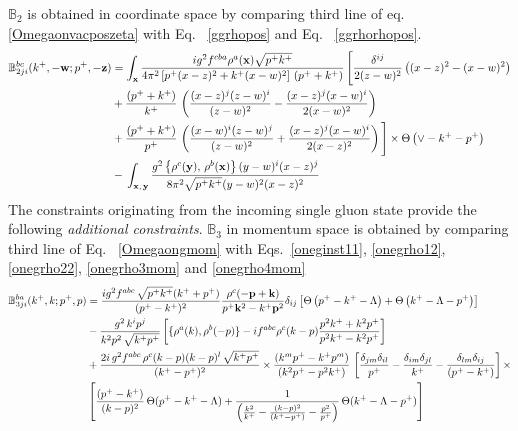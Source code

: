 \documentclass[aps,prd,amsmath,amssymb,nofootinbib]{revtex4-2}
\def\mf#1{\mathbb{#1}}
\def\v#1{\mathbf{#1}}
\numberwithin{equation}{section}
\begin{document}
$\mf{B}_{2}$ is obtained in coordinate space by comparing third line of eq. \eqref{Omegaonvacposzeta} with Eq.~ \eqref{ggrhopos} and Eq.~ \eqref{ggrhorhopos}.
\begin{align}
     \mf{B}^{bc}_{2ji}(k^{+}, -\v{w}; p^{+}, -\v{z}) & =    \int_{\mathbf{x}}\frac{ig^{2}f^{cba}\rho^{a}(\mathbf{x})\sqrt{p^{+}k^{+}}}{4\pi^{2}\left[p^{+}(x-z)^{2}+k^{+} (x-w)^{2}\right]\,(p^{+}+k^{+})}\,\Bigg[\frac{\delta^{ij}}{2(z-w)^{2}}\left((x-z)^{2}-(x-w)^{2}\right)\notag \\ & +\frac{(p^{+}+k^{+})}{k^{+}}\,\left(\frac{(x-z)^{j}(z-w)^{i}}{(z-w)^{2}}-\frac{(x-z)^{j}(x-w)^{i}}{2(x-w)^{2}}\right)\notag \\ & +\frac{(p^{+}+k^{+})}{p^{+}}\,\left(\frac{(x-w)^{i}(z-w)^{j}}{(z-w)^{2}} +\frac{(x-z)^{j}(x-w)^{i}}{2(x-z)^{2}}\right)\Bigg]\times \Theta\left(\vee-k^{+}-p^{+}\right) \notag \\ & -\,\int_{\mathbf{x},\,\mathbf{y}}\frac{g^{2}\left\{ \rho^{c}(\mathbf{y}),\,\rho^{b}(\mathbf{x})\right\} (y-w)^{i}(x-z)^{j}}{8\pi^{2}\sqrt{p^{+}k^{+}}(y-w)^{2}(x-z)^{2}}
\end{align}
The constraints originating from the incoming single gluon state provide the following {\it additional constraints}. $\mf{B}_{3}$ in momentum space is obtained by comparing third line of Eq.~ \eqref{Omegaongmom} with Eqs.~\eqref{oneginst11}, \eqref{onegrho12}, \eqref{onegrho22}, \eqref{onegrho3mom} and \eqref{onegrho4mom} 
\begin{align}
    \mf{B}^{ba}_{3ji}(k^{+},k; p^{+},p) & =  \frac{ig^2 f^{abc}\,\sqrt{p^{+}k^{+}} (k^++p^+) } {(p^+-k^+)^2} \frac{\rho^c(-\v{p}+\v{k})}{p^{+}\v{k}^2 - k^{+}\v{p}^2} \delta_{ij}\left[\Theta\left(p^{+} - k^{+} - \Lambda\right)+\Theta\left(k^{+}-\Lambda-p^{+}\right)\right]\notag \\ & -\frac{g^{2}\,k^{i}p^{j}}{k^{2}p^{2}\,\sqrt{k^{+}p^{+}}}\left[\{\rho^{a}(k),\rho^{b}(-p)\}-if^{abc}\rho^{c}(k-p)\frac{p^{2}k^{+}+k^{2}p^{+}}{p^{2}k^{+}-k^{2}p^{+}}\right]\notag \\ & +\frac{2i\,g^{2}f^{abc}\,\rho^{c}(k-p)(k-p)^{l}\,\sqrt{k^{+}p^{+}}}{(k^{+}-p^{+})^{2}}\times \frac{\left(k^{m}p^{+}-k^{+}p^{m}\right)}{\left(k^{2}p^{+}-p^{2}k^{+}\right)}\,\left[\frac{\delta_{jm}\delta_{il}}{p^{+}}-\frac{\delta_{im}\delta_{jl}}{k^{+}}-\frac{\delta_{lm}\delta_{ij}}{(p^{+}-k^{+})}\right]\times \notag \\ & \left[\frac{(p^{+}-k^{+})}{(k-p)^{2}}\,\Theta(p^{+}-k^{+}-\Lambda)+\frac{1}{\left(\frac{k^{2}}{k^{+}}-\frac{(k-p)^{2}}{(k^{+}-p^{+})}-\frac{p^{2}}{p^{+}}\right)}\,\Theta(k^{+}-\Lambda-p^{+})\right]
\end{align}
\end{document}
